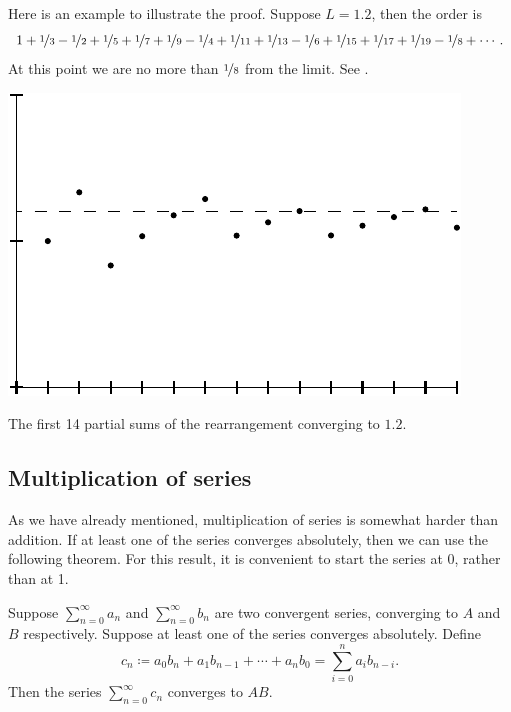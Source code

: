 \begin{example}
Here is an example to illustrate the proof.  Suppose $L=1.2$, then the order
is
\begin{equation*}
1+\nicefrac{1}{3}-\nicefrac{1}{2}+\nicefrac{1}{5}+\nicefrac{1}{7}+\nicefrac{1}{9}-\nicefrac{1}{4}+\nicefrac{1}{11}+\nicefrac{1}{13}-\nicefrac{1}{6}
+\nicefrac{1}{15}+\nicefrac{1}{17}+\nicefrac{1}{19} - \nicefrac{1}{8} + \cdots .
\end{equation*}
At this point we are no more than $\nicefrac{1}{8}$ from the limit.
See .
\begin{myfigureht}
\includegraphics{figures/ser-rearrange}
\caption{The first 14 partial sums of the rearrangement converging
to $1.2$.\label{fig:serrearrange}}
\end{myfigureht}
\end{example}

\subsection{Multiplication of series}

As we have
already mentioned,
multiplication of series is somewhat harder than addition.
If at least one of the series converges
absolutely, then we can use the following theorem.  For this result, it is
convenient to start the series at 0, rather than at 1.

\begin{thm}
Suppose $\sum_{n=0}^\infty a_n$ and $\sum_{n=0}^\infty b_n$ are two convergent series, converging
to $A$ and $B$ respectively.  Suppose at least one of the series
converges absolutely.  Define
\begin{equation*}
c_n \coloneqq a_0 b_n + a_1 b_{n-1} + \cdots + a_n b_0 = \sum_{i=0}^n a_i b_{n-i} .
\end{equation*}
Then the series $\sum_{n=0}^\infty c_n$
converges to $AB$.
\end{thm}

